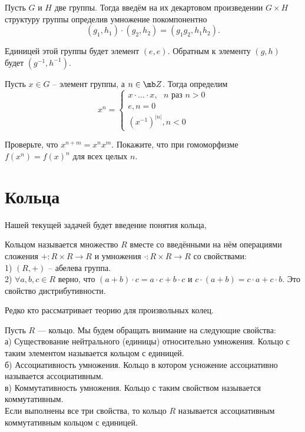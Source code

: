 Пусть $G$ и $H$ две группы. Тогда введём на  их декартовом произведении $G\times H$ структуру группы определив умножение покомпонентно 
$$(g_1,h_1)\cdot(g_2,h_2)=(g_1g_2, h_1h_2).$$
\edfn


\rm Единицей этой группы будет элемент $(e,e)$. Обратным к элементу $(g,h)$ будет $(g^{-1},h^{-1})$.
\erm



\dfn Пусть $x \in G$ -- элемент группы, а $n\in \mb Z$. Тогда определим $$x^n=\begin{cases}
x\cdot \dots \cdot x, \text{ $n$ раз } n>0\\
e, n=0\\
(x^{-1})^{|n|}, n<0
\end{cases}$$
\edfn

\upr Проверьте, что $x^{n+m}=x^nx^m$. Покажите, что при гомоморфизме $f(x^n)=f(x)^n$ для всех целых $n$.
\eupr






\section{Кольца}

Нашей текущей задачей будет введение понятия кольца, 

\dfn[Кольцо] Кольцом называется множество $R$ вместе со введёнными на нём операциями сложения $+\colon R\times R \to R$ и умножения $\cdot \colon R \times R \to R$ со свойствами:\\
1) $(R,+)$ – абелева группа.\\
2) $\forall a,b,c \in R$ верно, что $(a+b)\cdot c= a\cdot c+ b\cdot c$ и  $c\cdot (a+b)= c\cdot a+ c\cdot b$. Это свойство дистрибутивности.
\edfn

Редко кто рассматривает теорию для произвольных колец.

 Пусть $R$ --- кольцо. Мы будем обращать внимание на следующие свойства:\\
а) Существование нейтрального (единицы) относительно умножения. Кольцо с таким элементом называется кольцом с единицей.\\
б) Ассоциативность умножения. Кольцо в котором усножение ассоциативно называется ассоциативным. \\
в) Коммутативность умножения. Кольцо с таким свойством называется коммутативным.\\
Если выполнены все три свойства, то кольцо $R$ называется ассоциативным коммутативным кольцом с единицей.
\edfn





